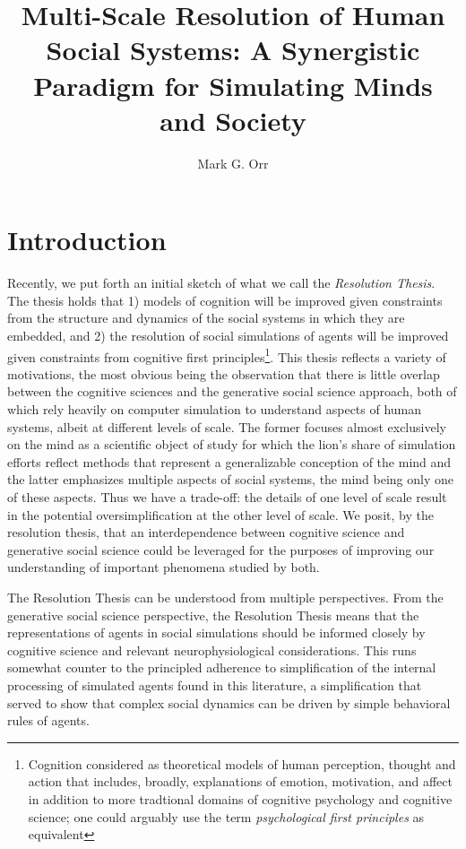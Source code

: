 \documentclass{article}
\title{Multi-Scale Resolution of Human Social Systems:  A Synergistic Paradigm for Simulating Minds and Society}
\author{Mark G. Orr}
\begin{document}
\maketitle

\section{Introduction}
Recently, we put forth an initial sketch of what we call the \textit{Resolution Thesis}\cite{orr2018brims}.  The thesis holds that 1) models of cognition will be improved given constraints from the structure and dynamics of the social systems in which they are embedded, and 2) the resolution of social simulations of agents will be improved given constraints from cognitive first principles\footnote{Cognition considered as theoretical models of human perception, thought and action that includes, broadly, explanations of emotion, motivation, and affect in addition to more tradtional domains of cognitive psychology and cognitive science; one could arguably use the term \textit{psychological first principles} as equivalent}.  This thesis reflects a variety of motivations, the most obvious being the observation that there is little overlap between the cognitive sciences and the generative social science approach, both of which rely heavily on computer simulation to understand aspects of human systems, albeit at different levels of scale.  The former focuses almost exclusively on the mind as a scientific object of study for which the lion's share of simulation efforts reflect methods that represent a generalizable conception of the mind and the latter emphasizes multiple aspects of social systems, the mind being only one of these aspects. Thus we have a trade-off: the details of one level of scale result in the potential oversimplification at the other level of scale.  We posit, by the resolution thesis, that an interdependence between cognitive science and generative social science could be leveraged for the purposes of improving our understanding of important phenomena studied by both.    

The Resolution Thesis can be understood from multiple perspectives.  From the generative social science perspective, the Resolution Thesis means that the representations of agents in social simulations should be informed closely by cognitive science and relevant neurophysiological considerations.  This runs somewhat counter to the principled adherence to simplification of the internal processing of simulated agents found in this literature, a simplification that served to show that complex social dynamics can be driven by simple behavioral rules of agents.  
\end{document}
